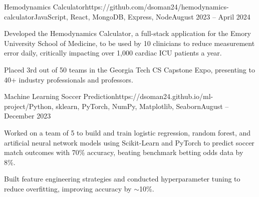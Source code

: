 \documentclass{article}
\begin{document}
\begin{flushleft}

    \vspace{3pt}

    \begin{project}{Hemodynamics Calculator}{https://github.com/dsoman24/hemodynamics-calculator}{JavaScript, React, MongoDB, Express, Node}{August 2023 -- April 2024}
        \item Developed the Hemodynamics Calculator, a full-stack application for the Emory University School of Medicine, to be used by 10 clinicians to reduce measurement error daily, critically impacting over 1,000 cardiac ICU patients a year.
        \item Placed 3rd out of 50 teams in the Georgia Tech CS Capstone Expo, presenting to 40+ industry professionals and professors.
    \end{project}

    \begin{project}{Machine Learning Soccer Prediction}{https://dsoman24.github.io/ml-project/}{Python, sklearn, PyTorch, NumPy, Matplotlib, Seaborn}{August -- December 2023}
        \item Worked on a team of 5 to build and train logistic regression, random forest, and artificial neural network models using Scikit-Learn and PyTorch to predict soccer match outcomes with 70\% accuracy, beating benchmark betting odds data by 8\%.
        \item Built feature engineering strategies and conducted hyperparameter tuning to reduce overfitting, improving accuracy by $\sim$10\%.
    \end{project}


    \vspace{3pt}
     \\
     \\
     \\

\end{flushleft}
\end{document}
